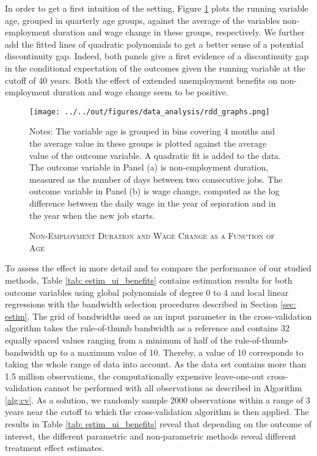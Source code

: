 \documentclass[11pt, a4paper, leqno]{article}
\numberwithin{equation}{section}
\numberwithin{figure}{section}
\numberwithin{table}{section}
\numberwithin{algorithm}{section}
\begin{document}
In order to get a first intuition of the setting, Figure \ref{fig: estim_ui_benefits} plots the running variable age, grouped in quarterly age groups, against the average of the variables non-employment duration and wage change in these groups, respectively. We further add the fitted lines of quadratic polynomials to get a better sense of a potential discontinuity gap. Indeed, both panels give a first evidence of a discontinuity gap in the conditional expectation of the outcomes given the running variable at the cutoff of 40 years. Both the effect of extended unemployment benefits on non-employment duration and wage change seem to be positive.

\begin{figure}[H]
	\centering
	\texttt{[image: ../../out/figures/data\_analysis/rdd\_graphs.png]}
	\caption{\textsc{Non-Employment Duration and Wage Change as a Function of Age}}
	\label{fig: estim_ui_benefits}
	\medskip
	\justify
	\footnotesize{Notes: The variable age is grouped in bins covering 4 months and the average value in these groups is plotted against the average value of the outcome variable. A quadratic fit is added to the data. The outcome variable in Panel (a) is non-employment duration, measured as the number of days between two consecutive jobs. The outcome variable in Panel (b) is wage change, computed as the log difference between the daily wage in the year of separation and in the year when the new job starts.}
\end{figure}

To assess the effect in more detail and to compare the performance of our studied methods, Table \ref{tab: estim_ui_benefits} contains estimation results for both outcome variables using global polynomials of degree 0 to 4 and local linear regressions with the bandwidth selection procedures described in Section \ref{sec: estim}. The grid of bandwidths used as an input parameter in the cross-validation algorithm takes the rule-of-thumb bandwidth as a reference and contains 32 equally spaced values ranging from a minimum of half of the rule-of-thumb-bandwidth up to a maximum value of 10. Thereby, a value of 10 corresponds to taking the whole range of data into account. As the data set contains more than 1.5 million observations, the computationally expensive leave-one-out cross-validation cannot be performed with all observations as described in Algorithm \ref{alg:cv}. As a solution, we randomly sample 2000 observations within a range of 3 years near the cutoff to which the cross-validation algorithm is then applied. The results in Table \ref{tab: estim_ui_benefits} reveal that depending on the outcome of interest, the different parametric and non-parametric methods reveal different treatment effect estimates.
\end{document}
